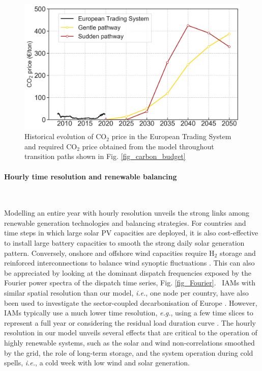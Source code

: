 \documentclass[5p]{elsarticle} %
\begin{document}
\begin{figure}[!h]
\centering
\includegraphics[width=\columnwidth]{figures/co2_price.png}
\caption{Historical evolution of CO$_2$ price in the European Trading System \cite{ETS} and required CO$_2$ price obtained from the model throughout transition paths shown in Fig. \ref{fig_carbon_budget}} \label{fig_co2price} 
\end{figure}
\FloatBarrier

\paragraph{\textbf{Hourly time resolution and renewable balancing}} \

Modelling an entire year with hourly resolution unveils the strong links among renewable generation technologies and balancing strategies. For countries and time steps in which large solar PV capacities are deployed, it is also cost-effective to install large battery capacities to smooth the strong daily solar generation pattern. Conversely, onshore and offshore wind capacities require H$_2$ storage and reinforced interconnections to balance wind synoptic fluctuations \cite{Rasmussen_2012, Rodriguez_2014, Schlachtberger_2017, Victoria_2019_storage}. %
This can also be appreciated by looking at the dominant dispatch frequencies exposed by the Fourier power spectra of the dispatch time series, Fig. \ref{fig_Fourier}. \
IAMs with similar spatial resolution than our model, \textit{i.e.}, one node per country, have also been used to investigate the sector-coupled decarbonisation of Europe \cite{in-depth_2018, JRC-EU-TIMES, Creutzig_2017}. However, IAMs typically use a much lower time resolution, \textit{e.g.}, using a few time slices to represent a full year \cite{JRC-EU-TIMES, Loffler_2019, Poncelet_2016, McGlade_2015, Babrowski_2014} or considering the residual load duration curve \cite{Creutzig_2017, Ueckerdt_2017}. The hourly resolution in our model unveils several effects that are critical to the operation of highly renewable systems, such as the solar and wind non-correlations smoothed by the grid, the role of long-term storage, and the system operation during cold spells, \textsl{i.e.}, a cold week with low wind and solar generation.
\end{document}
